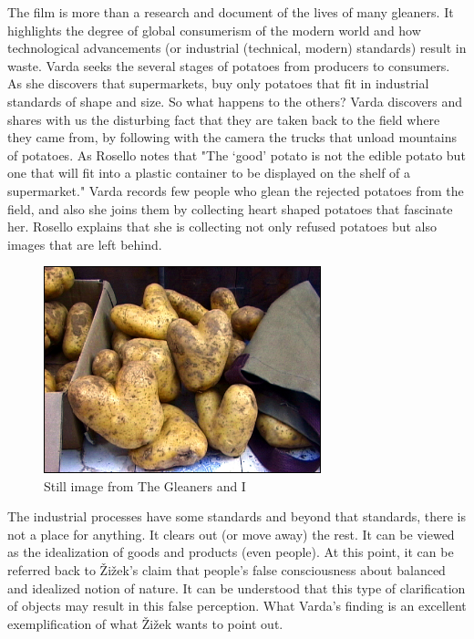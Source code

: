 The film is more than a research and document of the lives of many gleaners. It highlights the degree of global consumerism of the modern world and how technological advancements (or industrial (technical, modern) standards) result in waste. Varda seeks the several stages of potatoes from producers to consumers. As she discovers that supermarkets, buy only potatoes that fit in industrial standards of shape and size. So what happens to the others? Varda discovers and shares with us the disturbing fact that they are taken back to the field where they came from, by following with the camera the trucks that unload mountains of potatoes. As Rosello notes that "The ‘good’ potato is not the edible potato but one that will fit into a plastic container to be displayed on the shelf of a supermarket." Varda records few people who glean the rejected potatoes from the field, and also she joins them by collecting heart shaped potatoes that fascinate her. Rosello explains that she is collecting not only refused potatoes but also images that are left behind.

\begin{figure}[h!]
  \centering
  \includegraphics[height=6cm]{graphics/AgnesVarda_Potatoes.jpg}
  \caption{Still image from The Gleaners and I}
  \label{fig:AgnesVarda_Potatoes}
\end{figure}

The industrial processes have some standards and beyond that standards, there is not a place for anything. It clears out (or move away) the rest. It can be viewed as the idealization of goods and products (even people). At this point, it can be referred back to Žižek's claim that people's false consciousness about balanced and idealized notion of nature. It can be understood that this type of clarification of objects may result in this false perception. What Varda's finding is an excellent exemplification of what Žižek wants to point out.

